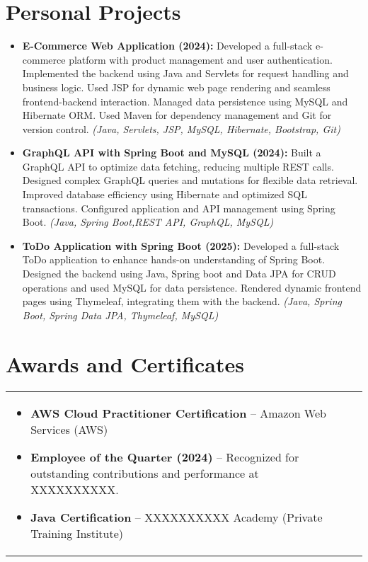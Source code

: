 \documentclass[a4paper,8pt]{article}
\begin{document}
\section{Personal Projects}
\begin{itemize}[nosep,after=\strut, leftmargin=2em, itemsep=3pt]
    \item \textbf{E-Commerce Web Application (2024):} Developed a full-stack e-commerce platform with product management and user authentication. Implemented the backend using Java and Servlets for request handling and business logic. Used JSP for dynamic web page rendering and seamless frontend-backend interaction. Managed data persistence using MySQL and Hibernate ORM. Used Maven for dependency management and Git for version control. \textit{(Java, Servlets, JSP, MySQL, Hibernate, Bootstrap, Git)}
    \item \textbf{GraphQL API with Spring Boot and MySQL (2024):} Built a GraphQL API to optimize data fetching, reducing multiple REST calls. Designed complex GraphQL queries and mutations for flexible data retrieval. Improved database efficiency using Hibernate and optimized SQL transactions. Configured application and API management using Spring Boot. \textit{(Java, Spring Boot,REST API, GraphQL, MySQL)}
    \item \textbf{ToDo Application with Spring Boot (2025):} Developed a full-stack ToDo application to enhance hands-on understanding of Spring Boot. Designed the backend using Java, Spring boot and Data JPA for CRUD operations and used MySQL for data persistence. Rendered dynamic frontend pages using Thymeleaf, integrating them with the backend. \textit{(Java, Spring Boot, Spring Data JPA, Thymeleaf, MySQL)}

\end{itemize}

\vspace{10pt}

\section{Awards and Certificates}
\begin{tabularx}{\linewidth}{ @{}l r@{} }
\begin{minipage}[t]{\linewidth}
    \begin{itemize}[nosep,after=\strut, leftmargin=2em, itemsep=3pt]
        \item \textbf{AWS Cloud Practitioner Certification} – Amazon Web Services (AWS)
        \item \textbf{Employee of the Quarter (2024)} – Recognized for outstanding contributions and performance at XXXXXXXXXX.
        \item \textbf{Java Certification} – XXXXXXXXXX Academy (Private Training Institute)
    \end{itemize}
\end{minipage}
\end{tabularx}
\end{document}
